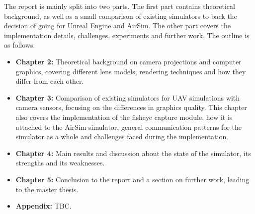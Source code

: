 The report is mainly split into two parts. The first part contains theoretical background, as well as a small comparison of existing simulators to back the decision of going for Unreal Engine and AirSim. The other part covers the implementation details, challenges, experiments and further work. The outline is as follows:

\begin{itemize}
    \item \textbf{Chapter 2:} Theoretical background on camera projections and computer graphics, covering different lens models, rendering techniques and how they differ from each other.
    \item \textbf{Chapter 3:} Comparison of existing simulators for UAV simulations with camera sensors, focusing on the differences in graphics quality. This chapter also covers the implementation of the fisheye capture module, how it is attached to the AirSim simulator, general communication patterns for the simulator as a whole and challenges faced during the implementation.
    \item \textbf{Chapter 4:} Main results and discussion about the state of the simulator, its strengths and its weaknesses.
    \item \textbf{Chapter 5:} Conclusion to the report and a section on further work, leading to the master thesis.
    \item \textbf{Appendix:} TBC.
\end{itemize}

